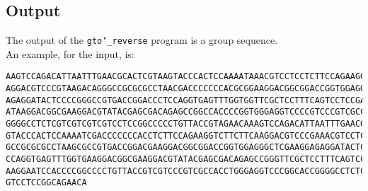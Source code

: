 \subsection*{Output}
The output of the \texttt{gto\char`_reverse} program is a group sequence.\\
An example, for the input, is:
\begin{lstlisting}
AAGTCCAGACATTAATTTGAACGCACTCGTAAGTACCCACTCCAAAATAAACGTCCTCCTCTTCCAGAAGGTCTTCTTCA
AGGACGTCCCGTAAGACAGGGCCGCGCGCCTAACGACCCCCCCACGCGGAAGGACGGCGGACCGGTGGAGGGCTCGAAGG
AGAGGATACTCCCCGGGCCGTGACCGGACCCTCCAGGTGAGTTTGGTGGTTCGCTCCTTTCAGTCCTCCGACGAAAAGGA
ATAAGGACGGCGAAGGACGTATACGAGCGACAGAGCCGGCCACCCCGGTGGGAGGTCCCCGTCCCGTCGCCACCGGCACC
GGGGCCTCTCGTCGTCGTCGTCCTCCGGCCCCCTGTTACCGTAGAACAAAGTCCAGACATTAATTTGAACGCACTCGTAA
GTACCCACTCCAAAATCGACCCCCCCACCTCTTCCAGAAGGTCTTCTTCAAGGACGTCCCGAAACGTCCTCTAAGACAGG
GCCGCGCGCCTAAGCGCCGTGACCGGACGAAGGACGGCGGACCGGTGGAGGGCTCGAAGGAGAGGATACTCCCCGGGCCT
CCAGGTGAGTTTGGTGAAGGACGGCGAAGGACGTATACGAGCGACAGAGCCGGGTTCGCTCCTTTCAGTCCTCCGACGAA
AAGGAATCCACCCCGGCCCCTGTTACCGTCGTCCCGTCGCCACCTGGGAGGTCCCGGCACCGGGGCCTCTCGTCGTCGTC
GTCCTCCGGCAGAACA
\end{lstlisting}